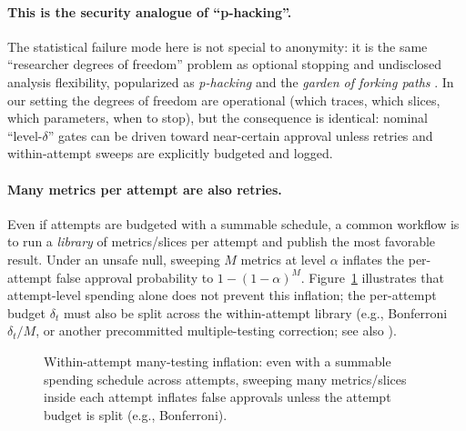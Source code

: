 \documentclass[11pt]{article}
\begin{document}
\paragraph{This is the security analogue of ``p-hacking''.}
The statistical failure mode here is not special to anonymity: it is the same ``researcher degrees of freedom'' problem as optional stopping and undisclosed analysis flexibility,
popularized as \emph{p-hacking} and the \emph{garden of forking paths} \cite{simmons2011falsepositive,gelman2013forkingpaths}.
In our setting the degrees of freedom are operational (which traces, which slices, which parameters, when to stop), but the consequence is identical:
nominal ``level-$\delta$'' gates can be driven toward near-certain approval unless retries and within-attempt sweeps are explicitly budgeted and logged.

\paragraph{Many metrics per attempt are also retries.}
Even if attempts are budgeted with a summable schedule, a common workflow is to run a \emph{library} of metrics/slices per attempt and publish the most favorable result.
Under an unsafe null, sweeping $M$ metrics at level $\alpha$ inflates the per-attempt false approval probability to $1-(1-\alpha)^M$.
Figure~\ref{fig:within_attempt_library} illustrates that attempt-level spending alone does not prevent this inflation; the per-attempt budget $\delta_t$ must also be split across the within-attempt library
(e.g., Bonferroni $\delta_t/M$, or another precommitted multiple-testing correction; see also \cite{series:manytestinglowerbounds}).

\begin{figure}[t]
\centering
{}
\caption{Within-attempt many-testing inflation: even with a summable spending schedule across attempts, sweeping many metrics/slices inside each attempt inflates false approvals unless the attempt budget is split (e.g., Bonferroni).}
\label{fig:within_attempt_library}
\end{figure}
\end{document}
